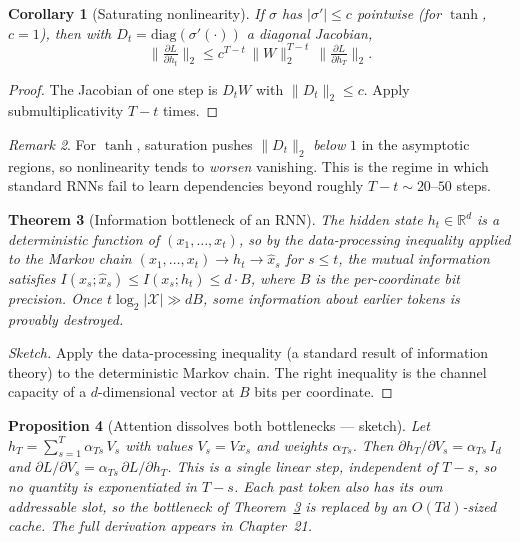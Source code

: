 \documentclass[11pt]{article}
\newtheorem{theorem}{Theorem}[section]
\newtheorem{proposition}[theorem]{Proposition}
\newtheorem{corollary}[theorem]{Corollary}
\theoremstyle{remark}
\newtheorem{remark}[theorem]{Remark}
\begin{document}
\begin{corollary}[Saturating nonlinearity]
\label{cor:nonlin}
If $\sigma$ has $|\sigma'| \leq c$ pointwise (for $\tanh$, $c = 1$),
then with $D_t = \mathrm{diag}(\sigma'(\cdot))$ a diagonal Jacobian,
\[
  \Big\|\tfrac{\partial L}{\partial h_t}\Big\|_2
  \leq c^{T-t}\,\|W\|_2^{T-t}\,
       \Big\|\tfrac{\partial L}{\partial h_T}\Big\|_2.
\]
\end{corollary}

\begin{proof}
The Jacobian of one step is $D_t W$ with $\|D_t\|_2 \leq c$. Apply
submultiplicativity $T-t$ times.
\end{proof}

\begin{remark}
For $\tanh$, saturation pushes $\|D_t\|_2$ \emph{below} $1$ in the
asymptotic regions, so nonlinearity tends to \emph{worsen} vanishing.
This is the regime in which standard RNNs fail to learn dependencies
beyond roughly $T - t \sim 20$--$50$ steps.
\end{remark}

\begin{theorem}[Information bottleneck of an RNN]
\label{thm:bottleneck}
The hidden state $h_t \in \mathbb{R}^d$ is a deterministic function of
$(x_1, \dots, x_t)$, so by the data-processing inequality applied to
the Markov chain $(x_1, \dots, x_t) \to h_t \to \hat x_s$ for $s \leq t$,
the mutual information satisfies
$I(x_s ; \hat x_s) \leq I(x_s ; h_t) \leq d \cdot B$, where $B$ is the
per-coordinate bit precision. Once $t \log_2 |\mathcal{X}| \gg d B$,
some information about earlier tokens is provably destroyed.
\end{theorem}

\begin{proof}[Sketch]
Apply the data-processing inequality (a standard result of information
theory) to the deterministic Markov chain. The right inequality is
the channel capacity of a $d$-dimensional vector at $B$ bits per
coordinate.
\end{proof}

\begin{proposition}[Attention dissolves both bottlenecks --- sketch]
\label{prop:attention}
Let $h_T = \sum_{s=1}^T \alpha_{Ts}\,V_s$ with values $V_s = V x_s$ and
weights $\alpha_{Ts}$. Then $\partial h_T / \partial V_s = \alpha_{Ts}\,I_d$
and $\partial L / \partial V_s = \alpha_{Ts}\,\partial L/\partial h_T$.
This is a \emph{single} linear step, independent of $T - s$, so no
quantity is exponentiated in $T - s$. Each past token also has its own
addressable slot, so the bottleneck of Theorem~\ref{thm:bottleneck} is
replaced by an $O(Td)$-sized cache. The full derivation appears in
Chapter~21.
\end{proposition}
\end{document}
